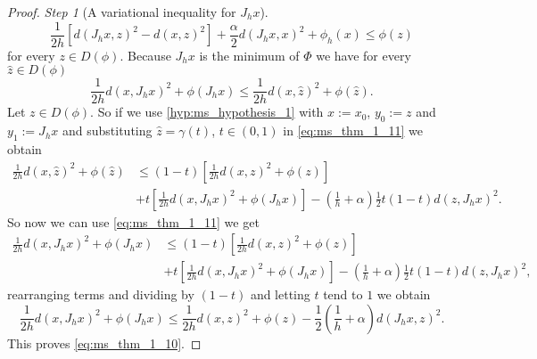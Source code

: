\documentclass[a4paper,11pt, leqno]{scrreprt} %
\renewcommand{\leq}{\leqslant}
\renewcommand{\leq}{\leqslant}
\theoremstyle{change}
\theoremstyle{nonumberplain}
\newtheorem{proof}{Proof}
\begin{document}
\begin{proof}
  \textit{Step 1} (A variational inequality for $J_h x$).
  \begin{equation}
    \label{eq:ms_thm_1_10}
    \frac1{2h}[d(J_h x, z)^2 - d(x, z)^2] + \frac\alpha2 d(J_h x, x)^2
    + \phi_h(x) \leq \phi(z)
  \end{equation}
  for every $z \in D(\phi)$. Because $J_h x$ is the minimum of $\Phi$
  we have for every $\hat z \in D(\phi)$
  \begin{equation}
    \label{eq:ms_thm_1_11}
    \frac1{2h} d(x, J_h x)^2 + \phi(J_h x) \leq \frac1{2h} d(x, \hat
    z)^2 + \phi(\hat z).
  \end{equation}
  Let $z \in D(\phi)$. So if we use \ref{hyp:ms_hypothesis_1} with $x
  := x_0$, $y_0 := z$ and $y_1 := J_h x$ and substituting $\hat z =
  \gamma(t)$, $t \in (0,1)$ in \eqref{eq:ms_thm_1_11} we obtain
  \begin{equation}
    \label{eq:ms_thm_1_12}
    \begin{split}
      \frac1{2h} d(x, \hat z)^2 + \phi(\hat z) &\leq (1 - t) \left [
        \frac1{2h} d(x, z)^2 + \phi(z) \right]\\
      &+ t \left [\frac1{2h} d(x, J_h x)^2 + \phi(J_h x) \right ] - \left
        ( \frac1h + \alpha \right ) \frac12 t(1 - t) d(z, J_h x)^2.
    \end{split}
  \end{equation}
  So now we can use \eqref{eq:ms_thm_1_11} we get
  \begin{equation}
    \label{eq:ms_thm_1_13}
    \begin{split}
      \frac1{2h} d(x, J_h x)^2 + \phi(J_h x) &\leq (1 - t) \left [
        \frac1{2h} d(x, z)^2 + \phi(z) \right]\\
      &+ t \left [\frac1{2h} d(x, J_h x)^2 + \phi(J_h x) \right ] - \left
        ( \frac1h + \alpha \right ) \frac12 t(1 - t) d(z, J_h x)^2,
    \end{split}
  \end{equation}
  rearranging terms and dividing by $(1 - t)$ and letting $t$ tend to
  $1$ we obtain
  \begin{equation}
    \label{eq:ms_thm_1_14}
    \frac1{2h} d(x, J_h x)^2 + \phi(J_h x) \leq \frac1{2h} d(x, z)^2 +
    \phi(z) - \frac12 \left ( \frac1h + \alpha \right ) d(J_h x, z)^2.
  \end{equation}
  This proves \eqref{eq:ms_thm_1_10}.


\end{proof}
\end{document}
